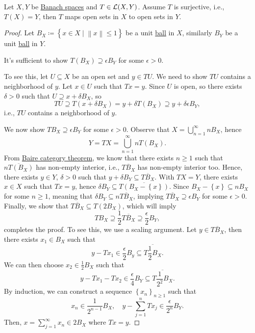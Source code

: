 \begin{theorem}\label{thm:open-mapping}
	Let \(X, Y\) be \hyperref[def:Banach-space]{Banach spaces} and \(T\in \mathcal{\MakeUppercase{l}} (X, Y)\). Assume \(T\) is surjective, i.e., \(T(X)= Y\), then \(T\) maps open sets in \(X\) to open sets in \(Y\).
\end{theorem}
\begin{proof}
	Let \(B_X \coloneqq \left\{ x\in X \mid \left\lVert x\right\rVert \leq 1 \right\} \) be a unit \hyperref[def:ball]{ball} in \(X\), similarly \(B_Y\) be a unit \hyperref[def:ball]{ball} in \(Y\).

	\begin{claim}
		It's sufficient to show \(T(B_X) \supseteq \epsilon B_Y\) for some \(\epsilon > 0\).
	\end{claim}
	\begin{explanation}
		To see this, let \(U \subseteq X\) be an open set and \(y\in TU\). We need to show \(TU\) contains a neighborhood of \(y\). Let \(x\in U\) such that \(Tx = y\). Since \(U\) is open, so there exists \(\delta > 0\) such that \(U \supseteq x + \delta B_X\), so
		\[
			TU \supseteq T(x + \delta B_X) = y + \delta T(B_X) \supseteq y + \delta \epsilon B_Y,
		\]
		i.e., \(TU\) contains a neighborhood of \(y\).
	\end{explanation}

	We now show \(TB_X \supseteq \epsilon B_Y\) for some \(\epsilon > 0\). Observe that \(X = \bigcup_{n=1}^{\infty} n B_X\), hence
	\[
		Y = TX = \bigcup\limits_{n=1}^{\infty } n T(B_{X}).
	\]
	From \hyperref[prop:Baire-category]{Baire category theorem}, we know that there exists \(n \geq 1\) such that \(\overline{nT(B_X)}\) has non-empty interior, i.e., \(\overline{TB_X}\) has non-empty interior too. Hence, there exists \(y\in Y\), \(\delta > 0\) such that \(y + \delta B_Y \subseteq \overline{TB_X}\). With \(TX=Y\), there exists \(x\in X\) such that \(Tx = y\), hence \(\delta B_Y \subseteq \overline{T(B_X - \left\{ x \right\} )}\). Since \(B_X - \left\{ x \right\} \subseteq n B_X\) for some \(n \geq 1\), meaning that \(\delta B_Y \subseteq n \overline{TB_X}\), implying \(\overline{TB_X}\supseteq \epsilon B_Y\) for some \(\epsilon > 0\). Finally, we show that \(\overline{TB_X} \subseteq T(2 B_X)\), which will imply
	\[
		TB_X \supseteq \frac{1}{2}\overline{TB_X} \supseteq \frac{\epsilon}{2} B_Y,
	\]
	completes the proof. To see this, we use a scaling argument. Let \(y\in \overline{TB_X}\), then there exists \(x_1 \in B_X\) such that
	\[
		y-Tx_1 \in \frac{\epsilon}{2} B_y \subseteq \overline{T \frac{1}{2}B_X}.
	\]
	We can then choose \(x_2\in \frac{1}{2}B_X\) such that
	\[
		y-Tx_1 - Tx_2 \in \frac{\epsilon}{4}B_Y \subseteq \overline{T\frac{1}{2^2}B_X}.
	\]
	By induction, we can construct a sequence \(\left\{ x_n \right\}_{n\geq 1} \) such that
	\[
		x_n \in \frac{1}{2^{n-1}}B_X,\quad y- \sum_{j=1}^n Tx_j\in \frac{\epsilon}{2^n} B_Y.
	\]
	Then, \(x = \sum_{j=1} ^{\infty }x_n \in 2B_X\) where \(Tx = y\).
\end{proof}

